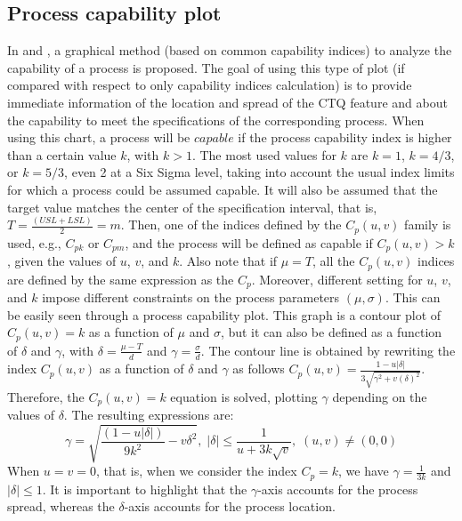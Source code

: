 \subsection{Process capability plot}
In \citet{vannman2001graphical} and \citet{deleryd1999process}, a graphical method (based on common capability indices) to analyze the capability of a process is proposed. 
The goal of using this type of plot (if compared with respect to only capability indices calculation) is to provide immediate information of the location and spread of the CTQ feature and about the capability to meet the specifications of the corresponding process. 
When using this chart, a process will be $capable$ if the process capability index is higher than a certain value $k$, with $k> 1$. 
The most used values for $k$ are $k = 1$, $k = 4/3$, or $k = 5/3$, even 2 at a Six Sigma level, taking into account the usual index limits for which a process could be assumed capable.  
It will also be assumed that the target value matches the center of the specification interval, that is,  $T = \frac{\left( USL + LSL\right)}{2} = m$. 
Then, one of the indices defined by the $C_p\left( u,v\right)$ family is used, e.g., $C_{pk}$ or $C_{pm}$,
and the process will be defined as capable if $C_p\left( u, v \right)> k$, given the values of $u$, $v$, and $k$. 
Also note that if $\mu = T$, all the $C_p\left( u, v\right)$ indices are defined by the same expression as the $C_p$. 
Moreover, different setting for $u$, $v$, and $k$ impose different constraints on the process parameters $\left( \mu, \sigma \right)$. 
This can be easily seen through a process capability plot. 
This graph is a contour plot of $C_p\left( u, v\right)  = k$ as a function of $\mu$ and $\sigma$, but it can also be defined as a function of $\delta$ and $\gamma$, with $\delta = \frac{\mu - T}{d}$ and $\gamma = \frac{\sigma}{d}$. 
The contour line is obtained by rewriting the index $C_p\left( u,v\right)$ as a function of $\delta$ and $\gamma$ as follows $ C_p\left( u,v\right)= \frac{1-u\vert \delta \vert}{3\sqrt{\gamma^2+v\left( \delta \right)^2}}$. 
Therefore, the $C_p\left( u,v\right) = k$ equation is solved, plotting $\gamma$ depending on the values of $\delta$. 
The resulting expressions are:
$$ \gamma = \sqrt{\frac{\left( 1-u\vert\delta\vert\right)}{9k^2}-v\delta^2}, \; \vert\delta\vert \leq \frac{1}{u+3k\sqrt{v}}, \; \left( u,v\right) \neq \left(0,0 \right)$$
When $u = v = 0$, that is, when we consider the index $C_p=k$, we have $\gamma = \frac{1}{3k}$ and $\vert\delta\vert \leq 1$. 
It is important to highlight that the $\gamma$-axis accounts for the process spread, whereas the $\delta$-axis accounts for the process location. 
